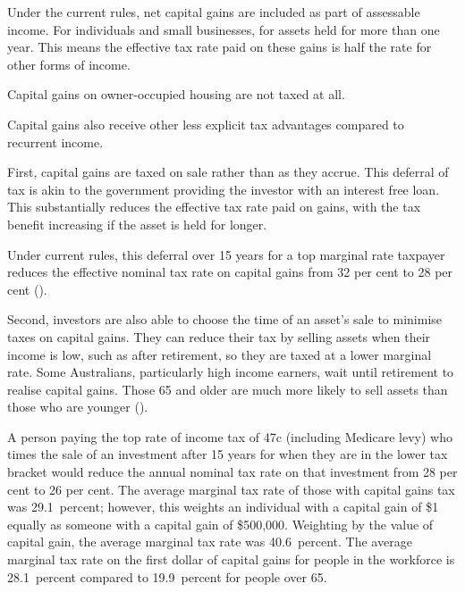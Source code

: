 \documentclass{grattan}\usepackage[]{graphicx}\usepackage[]{color}
\begin{document}
Under the current rules, net capital gains are included as part of assessable income.  For individuals and small businesses,  for assets held for more than one year. This means the effective tax rate paid on these gains is half the rate for other forms of income. 

Capital gains on owner-occupied housing are not taxed at all.

Capital gains also receive other less explicit tax advantages compared to recurrent income.

First, capital gains are taxed on sale rather than as they accrue. This deferral of tax is akin to the government providing the investor with an interest free loan.  This substantially reduces the effective tax rate paid on gains, with the tax benefit increasing if the asset is held for longer.


Under current rules, this deferral over 15 years for a top marginal rate taxpayer reduces the effective nominal tax rate on capital gains from 32 per cent to 28 per cent ().

Second, investors are also able to choose the time of an asset's sale to minimise taxes on capital gains. They can reduce their tax by selling assets when their income is low, such as after retirement, so they are taxed at a lower marginal rate. Some Australians, particularly high income earners, wait until retirement to realise capital gains. Those 65 and older are much more likely to sell assets than those who are younger ().



A person paying the top rate of income tax of 47c (including Medicare levy) who times the sale of an investment after 15 years for when they are in the lower tax bracket would reduce the annual nominal tax rate on that investment from 28 per cent to 26 per cent. The average marginal tax rate of those with capital gains tax was 29.1~percent; however, this weights an individual with a capital gain of \$1 equally as someone with a capital gain of \$500,000. Weighting by the value of capital gain, the average marginal tax rate was 40.6~percent. The average marginal tax rate on the first dollar of capital gains for people in the workforce is 28.1~percent compared to 19.9~percent for people over 65.
\end{document}
